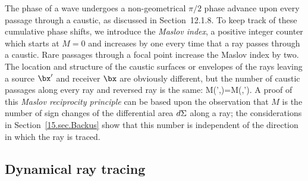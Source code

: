 The phase of a wave undergoes a non-geometrical
$\pi/2$ phase advance upon every passage through
a caustic, as discussed in Section~12.1.8.  To keep
track of these cumulative phase shifts, we introduce
the {\em Maslov index\/},
%
%
a positive integer counter
which starts at $M=0$ and increases by one every time
that a ray passes through a caustic.  Rare passages
through a focal point increase the Maslov index by two.
The location and structure of the
caustic surfaces or envelopes of the rays
leaving a source $\bx'$ and receiver $\bx$
are obviously different, but the number of
caustic passages along every ray and reversed
ray is the same:
\eq \label{15.Mrecip}
M(\bx',\bx)=M(\bx,\bx').
\en
A proof of this {\em Maslov reciprocity principle\/}
%
%
can be based upon the observation that $M$ is the number
of sign changes of the differential area $d\/\Sigma$ along
a ray; the considerations in Section~\ref{15.sec.Backus}
show that this number is independent of the direction
in which the ray is traced.
%
%

\subsection{Dynamical ray tracing}
%
%
%

